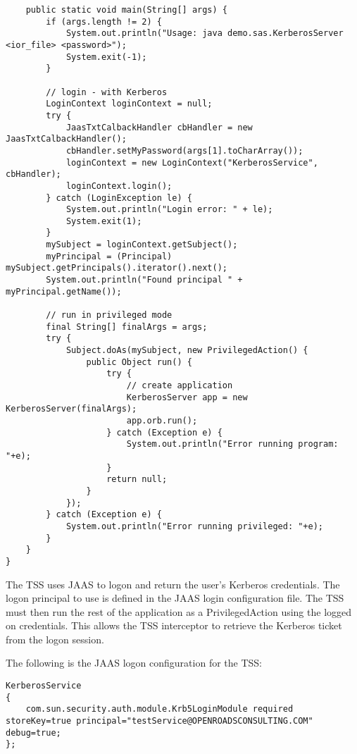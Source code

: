 \begin{scriptsize}
\begin{verbatim}
	public static void main(String[] args) {
		if (args.length != 2) {
			System.out.println("Usage: java demo.sas.KerberosServer <ior_file> <password>");
			System.exit(-1);
		}

		// login - with Kerberos
		LoginContext loginContext = null;
		try {
			JaasTxtCalbackHandler cbHandler = new JaasTxtCalbackHandler();
			cbHandler.setMyPassword(args[1].toCharArray());
			loginContext = new LoginContext("KerberosService", cbHandler);
			loginContext.login();
		} catch (LoginException le) {
			System.out.println("Login error: " + le);
			System.exit(1);
		}
		mySubject = loginContext.getSubject();
		myPrincipal = (Principal) mySubject.getPrincipals().iterator().next();
		System.out.println("Found principal " + myPrincipal.getName());

		// run in privileged mode
		final String[] finalArgs = args;
		try {
			Subject.doAs(mySubject, new PrivilegedAction() {
				public Object run() {
					try {
						// create application
						KerberosServer app = new KerberosServer(finalArgs);
						app.orb.run();
					} catch (Exception e) {
						System.out.println("Error running program: "+e);
					}
					return null;
				}
			});
		} catch (Exception e) {
			System.out.println("Error running privileged: "+e);
		}
	}
}
\end{verbatim}
\end{scriptsize}

The TSS uses JAAS to logon and return the user's Kerberos credentials. The
logon principal to use is defined in the JAAS login configuration file.
The TSS must then run the rest of the application as a PrivilegedAction using
the logged on credentials. This allows the TSS interceptor to retrieve the
Kerberos ticket from the logon session.

The following is the JAAS logon configuration for the TSS:

\begin{scriptsize}
\begin{verbatim}
KerberosService 
{
    com.sun.security.auth.module.Krb5LoginModule required storeKey=true principal="testService@OPENROADSCONSULTING.COM" debug=true;
};
\end{verbatim}
\end{scriptsize}

